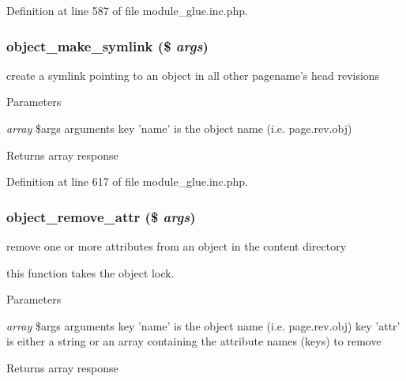 Definition at line 587 of file module\_\-glue.inc.php.

\hypertarget{module__glue_8inc_8php_a14e6da411df5aa9ff38e2d4ea27dd077}{
\subsubsection[{object\_\-make\_\-symlink}]{\setlength{\rightskip}{0pt plus 5cm}object\_\-make\_\-symlink (\$ {\em args})}}
\label{module__glue_8inc_8php_a14e6da411df5aa9ff38e2d4ea27dd077}
create a symlink pointing to an object in all other pagename's head revisions


\begin{DoxyParams}{Parameters}
\item[{\em array}]\$args arguments key 'name' is the object name (i.e. page.rev.obj) \end{DoxyParams}
\begin{DoxyReturn}{Returns}
array response 
\end{DoxyReturn}


Definition at line 617 of file module\_\-glue.inc.php.

\hypertarget{module__glue_8inc_8php_ae16d748c2d933978daec8bf11acdc34b}{
\subsubsection[{object\_\-remove\_\-attr}]{\setlength{\rightskip}{0pt plus 5cm}object\_\-remove\_\-attr (\$ {\em args})}}
\label{module__glue_8inc_8php_ae16d748c2d933978daec8bf11acdc34b}
remove one or more attributes from an object in the content directory

this function takes the object lock. 
\begin{DoxyParams}{Parameters}
\item[{\em array}]\$args arguments key 'name' is the object name (i.e. page.rev.obj) key 'attr' is either a string or an array containing the attribute names (keys) to remove \end{DoxyParams}
\begin{DoxyReturn}{Returns}
array response 
\end{DoxyReturn}



